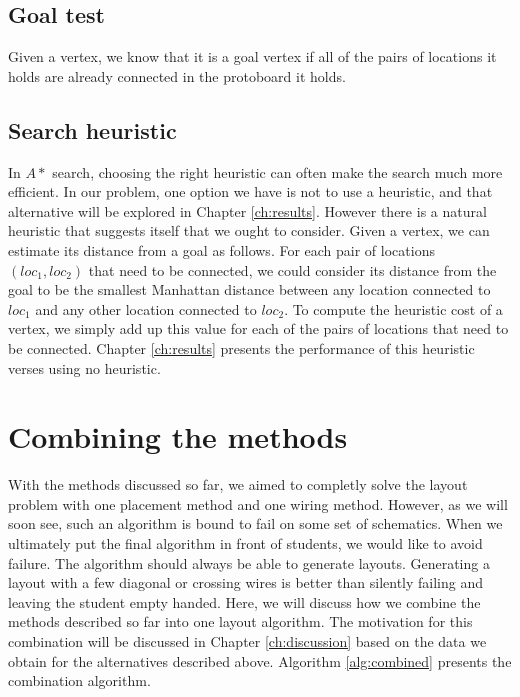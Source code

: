 \subsection{Goal test}

Given a vertex, we know that it is a goal vertex if all of the pairs of
locations it holds are already connected in the protoboard it holds.

\subsection{Search heuristic}

In $A*$ search, choosing the right heuristic can often make the search much more
efficient. In our problem, one option we have is not to use a heuristic, and
that alternative will be explored in Chapter \ref{ch:results}. However there is
a natural heuristic that suggests itself that we ought to consider. Given a
vertex, we can estimate its distance from a goal as follows. For each pair of
locations $(loc_1, loc_2)$ that need to be connected, we could consider its
distance from the
goal to be the smallest Manhattan distance between any location connected to
$loc_1$ and any other location connected to $loc_2$. To compute the heuristic
cost of a vertex, we simply add up this value for each of the pairs of locations
that need to be connected. Chapter \ref{ch:results} presents the performance of
this heuristic verses using no heuristic.

\section{Combining the methods}

With the methods discussed so far, we aimed to completly solve the layout problem
with one placement method and one wiring method. However, as we will soon see,
such an algorithm is bound to fail on some set of schematics. When we ultimately
put the final algorithm in front of students, we would like to avoid failure.
The algorithm should always be able to generate layouts. Generating a layout
with a few diagonal or crossing wires is better than silently failing and leaving
the student empty handed. Here, we will discuss how we combine the methods
described so far into one layout algorithm. The motivation for this combination
will be discussed in Chapter \ref{ch:discussion} based on the data we obtain
for the alternatives described above. Algorithm \ref{alg:combined} presents the
combination algorithm.


